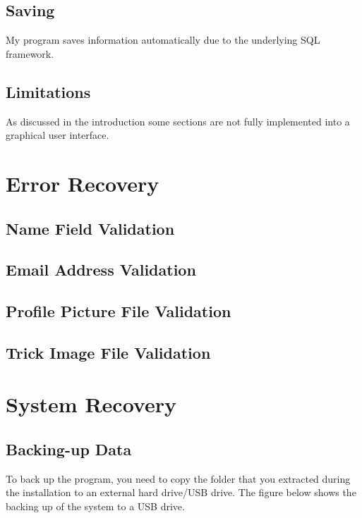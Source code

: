 \subsection{Saving}

My program saves information automatically due to the underlying SQL framework.

\subsection{Limitations}

As discussed in the introduction some sections are not fully implemented into a graphical user interface.





\section{Error Recovery}

\subsection{Name Field Validation}

\subsection{Email Address Validation}

\subsection{Profile Picture File Validation}

\subsection{Trick Image File Validation}






\section{System Recovery}

\subsection{Backing-up Data}

To back up the program, you need to copy the folder that you extracted during the installation to an external hard drive/USB drive. The figure below shows the backing up of the system to a USB drive.

